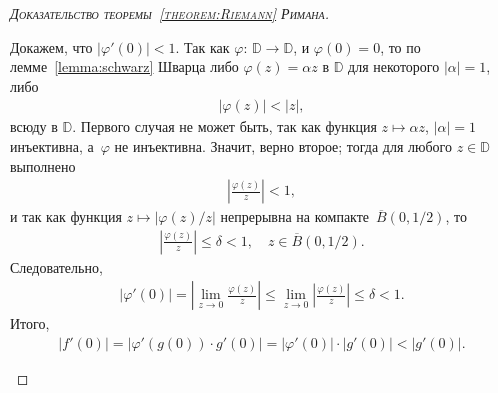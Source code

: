 \documentclass[../complex-analysis.tex]{subfiles}
\begin{document}
\begin{proof}[\normalfont\textsc{Доказательство теоремы~\ref{theorem:Riemann} Римана}]
\begin{enumerate}
   Докажем, что $ \left| \varphi'(0) \right| < 1 $. Так как $ \varphi\colon\,\mathbb D \to \mathbb D $, и $ \varphi(0) = 0 $, то по лемме~\ref{lemma:schwarz} Шварца либо $ \varphi(z) = \alpha z $ в $ \mathbb D $ для некоторого $ \left| \alpha \right| = 1 $, либо
   \begin{align*}
    \left| \varphi(z) \right| < \left| z \right|,
   \end{align*} всюду в $ \mathbb D $. Первого случая не может быть, так как функция $ z \mapsto \alpha z $, $ \left| \alpha \right|=1 $ инъективна, а~$ \varphi $ не инъективна. Значит, верно второе; тогда для любого $ z \in \mathbb D $ выполнено
   \begin{align*}
    \left| \frac{\varphi(z)}{z} \right| < 1,
   \end{align*} и так как функция $ z \mapsto \left| \varphi(z) / z \right| $ непрерывна на компакте~$ \overline B(0, 1 / 2) $, то
   \begin{align*}
    \left| \frac{\varphi(z)}{z} \right| \leqslant \delta < 1, \quad z \in \overline B(0, 1 / 2).
   \end{align*} Следовательно,
   \begin{align*}
    \left|\varphi'(0)\right| = \left| \lim_{z \to 0} \frac{\varphi(z)}{z} \right| \leqslant \lim_{z \to 0}  \left| \frac{\varphi(z)}{z} \right| \leqslant \delta < 1.
   \end{align*} Итого,
   \begin{align*}
    \left| f'(0) \right| = \left| \varphi'(g(0)) \cdot g'(0) \right| = \left| \varphi'(0) \right| \cdot \left| g'(0) \right| < \left| g'(0) \right|.
   \end{align*}


\end{enumerate}
\end{proof}
\end{document}
